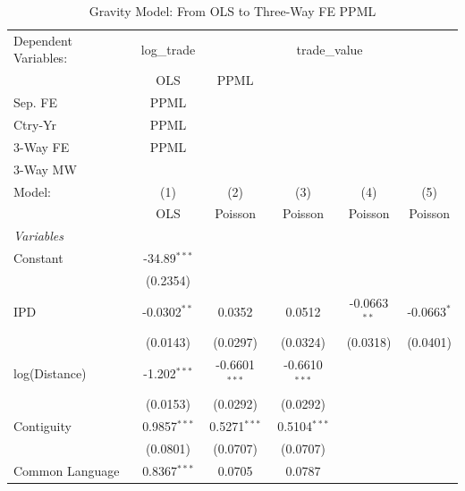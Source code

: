 
\begin{table}[htbp]
   \caption{Gravity Model: From OLS to Three-Way FE PPML}
   \centering
   \begin{tabular}{lccccc}
      \tabularnewline \midrule \midrule
      Dependent Variables: & log\_trade & \multicolumn{4}{c}{trade\_value}\\
                          & OLS            & PPML\\Sep. FE         & PPML\\Ctry-Yr         & PPML\\3-Way FE        & PPML\\3-Way MW \\     
      Model:              & (1)            & (2)                   & (3)                   & (4)                   & (5)\\  
                          &  OLS           & Poisson               & Poisson               & Poisson               & Poisson\\  
      \midrule
      \emph{Variables}\\
      Constant            & -34.89$^{***}$ &                       &                       &                       &   \\   
                          & (0.2354)       &                       &                       &                       &   \\   
      IPD                 & -0.0302$^{**}$ & 0.0352                & 0.0512                & -0.0663$^{**}$        & -0.0663$^{*}$\\   
                          & (0.0143)       & (0.0297)              & (0.0324)              & (0.0318)              & (0.0401)\\   
      log(Distance)       & -1.202$^{***}$ & -0.6601$^{***}$       & -0.6610$^{***}$       &                       &   \\   
                          & (0.0153)       & (0.0292)              & (0.0292)              &                       &   \\   
      Contiguity          & 0.9857$^{***}$ & 0.5271$^{***}$        & 0.5104$^{***}$        &                       &   \\   
                          & (0.0801)       & (0.0707)              & (0.0707)              &                       &   \\   
      Common Language     & 0.8367$^{***}$ & 0.0705                & 0.0787                &                       &   \\   

\end{tabular}
\end{table}
